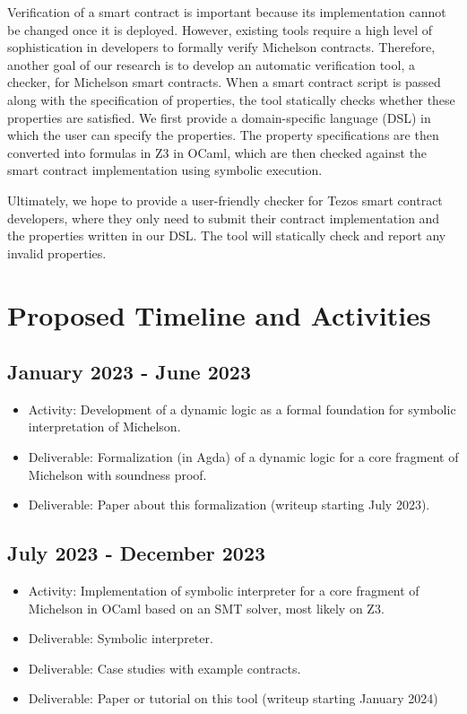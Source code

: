 \documentclass[a4paper,11pt]{article}
\begin{document}
Verification of a smart contract is important because its
implementation cannot be changed once it is deployed. However,
existing tools \cite{DBLP:conf/isola/BernardoCCJPT20} require a high
level of sophistication in developers 
to formally verify Michelson contracts. Therefore, another goal of
our research  is to develop an automatic verification tool, a checker, for
Michelson smart contracts. When a smart contract script is passed
along with the specification of properties, the tool statically checks
whether these properties are satisfied. We first provide a
domain-specific language (DSL) in which the user can specify the
properties. The property specifications are then converted into
formulas in Z3 in OCaml, which are then checked against the smart
contract implementation using symbolic execution. 

Ultimately, we hope to provide a user-friendly checker for Tezos smart contract developers, where they only need to submit their contract implementation and the properties written in our DSL. The tool will statically check and report any invalid properties.
 

\section{Proposed Timeline and Activities}
\label{sec:prop-timel-activ}

\subsection{January 2023 - June 2023}

\begin{itemize}
\item Activity: Development of a dynamic logic as a formal foundation for symbolic interpretation of Michelson. 
\item Deliverable: Formalization (in Agda) of a dynamic logic for a core fragment of Michelson with soundness proof.
\item Deliverable: Paper about this formalization (writeup starting July 2023).
\end{itemize}

\subsection{July 2023 - December 2023}
\label{sec:july-2023-december}

\begin{itemize}
\item Activity: Implementation of symbolic interpreter for a core fragment of Michelson in OCaml based on an SMT solver, most likely on Z3. 
\item Deliverable: Symbolic interpreter.
\item Deliverable: Case studies with example contracts.
\item Deliverable: Paper or tutorial on this tool (writeup starting January 2024)
\end{itemize}
\end{document}

